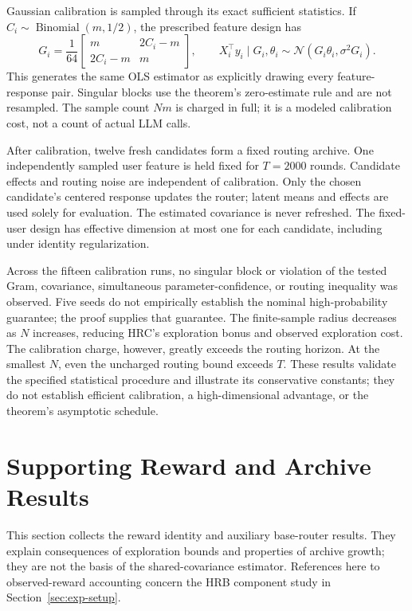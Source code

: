 \documentclass{article} %
\begin{document}
Gaussian calibration is sampled through its exact sufficient statistics.
If $C_i\sim\operatorname{Binomial}(m,1/2)$, the prescribed feature design has
\begin{equation}
G_i=\frac1{64}
\begin{bmatrix}
m & 2C_i-m\\
2C_i-m & m
\end{bmatrix},
\qquad
X_i^\top y_i\mid G_i,\theta_i
\sim\mathcal N(G_i\theta_i,\sigma^2G_i).
\end{equation}
This generates the same OLS estimator as explicitly drawing every
feature-response pair. Singular blocks use the theorem's zero-estimate
rule and are not resampled. The sample count $Nm$ is charged in full;
it is a modeled calibration cost, not a count of actual LLM calls.

After calibration, twelve fresh candidates form a fixed routing archive.
One independently sampled user feature is held fixed for $T=2000$ rounds.
Candidate effects and routing noise are independent of calibration.
Only the chosen candidate's centered response updates the router;
latent means and effects are used solely for evaluation.
The estimated covariance is never refreshed. The fixed-user design has
effective dimension at most one for each candidate, including under
identity regularization.



Across the fifteen calibration runs, no singular block or violation of the
tested Gram, covariance, simultaneous parameter-confidence, or routing
inequality was observed. Five seeds do not empirically establish the
nominal high-probability guarantee; the proof supplies that guarantee.
The finite-sample radius decreases as $N$ increases, reducing HRC's
exploration bonus and observed exploration cost. The calibration charge,
however, greatly exceeds the routing horizon. At the smallest $N$, even
the uncharged routing bound exceeds $T$. These results validate the
specified statistical procedure and illustrate its conservative constants;
they do not establish efficient calibration, a high-dimensional advantage,
or the theorem's asymptotic schedule.

\section{Supporting Reward and Archive Results}
\label{app:reward-support}

This section collects the reward identity and auxiliary base-router results.
They explain consequences of exploration bounds and properties of archive
growth; they are not the basis of the shared-covariance estimator.
References here to observed-reward accounting concern the HRB component
study in Section~\ref{sec:exp-setup}.
\end{document}
